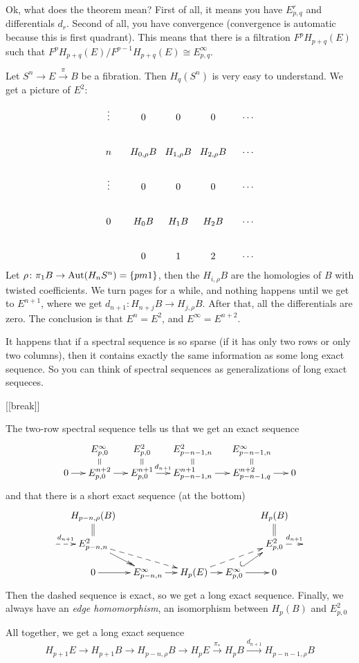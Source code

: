 Ok, what does the theorem mean? First of all, it means you have $E^r_{p,q}$ and differentials $d_r$. Second of all, you have convergence (convergence is automatic because this is first quadrant). This means that there is a filtration $F^pH_{p+q}(E)$ such that $F^pH_{p+q}(E)/F^{p-1}H_{p+q}(E) \cong E^\infty_{p,q}$.

\begin{example}
 Let $S^n\to E\xrightarrow\pi B$ be a fibration. Then $H_q(S^n)$ is very easy to understand. We get a picture of $E^2$:
 \[\xymatrix@!0 @+1pc{
  \vdots & 0 & 0 & 0 & \cdots\\
  n & H_{0,\rho} B & H_{1,\rho} B & H_{2,\rho}B & \cdots\\
  \vdots& 0 & 0 & 0 & \cdots \\
  0 & H_0B & H_1 B & H_2 B & \cdots\\
  & 0 & 1 & 2 & \cdots
 }\]
 Let $\rho\colon \pi_1 B\to \operatorname{Aut}(H_nS^n)=\{pm 1\}$, then the $H_{i,\rho} B$ are the homologies of $B$ with twisted coefficients. We turn pages for a while, and nothing happens until we get to $E^{n+1}$, where we get $d_{n+1}\colon H_{n+j}B\to H_{j,\rho}B$. After that, all the differentials are zero. The conclusion is that $E^n=E^2$, and $E^\infty=E^{n+2}$.
 
 It happens that if a spectral sequence is so sparse (if it has only two rows or only two columns), then it contains exactly the same information as some long exact sequence. So you can think of spectral sequences as generalizations of long exact sequeces.

 [[break]]
 
 The two-row spectral sequence tells us that we get an exact sequence
 \[\xymatrix@R-1.5pc @C-.8pc{
  & E^\infty_{p,0}\ar@{=}[d] & E^2_{p,0}\ar@{=}[d] & E^2_{p-n-1,n}\ar@{=}[d] & E^\infty_{p-n-1,n}\ar@{=}[d]\\
  0 \ar[r] & E^{n+2}_{p,0}\ar[r] & E^{n+1}_{p,0}\ar[r]^-{d_{n+1}} & E^{n+1}_{p-n-1,n} \ar[r] & E^{n+2}_{p-n-1,q}\ar[r]& 0
 }\]
 and that there is a short exact sequence (at the bottom)
 \[\xymatrix@-1pc{
  & H_{p-n,\rho}(B) \ar@{=}[d] & & & & H_p(B)\ar@{=}[d]\\
  \ar@{-->}[r]^-{d_{n+1}} & E^2_{p-n,n}\ar@{->>}[dr] \ar@{-->}[drr] & & & & E^2_{p,0} \ar@{-->}[r]^-{d_{n+1}} & \\
  & 0\ar[r] & E^\infty_{p-n,n}\ar[r] & H_p(E)\ar[r] \ar@{-->}[urr] & E^\infty_{p,0}\ar[r] \ar@{^(->}[ur] & 0
 }\]
 Then the dashed sequence is exact, so we get a long exact sequence. Finally, we always have an \emph{edge homomorphism}, an isomorphism between $H_p(B)$ and $E^2_{p,0}$
 
 All together, we get a long exact sequence
 \[
  H_{p+1}E\to H_{p+1} B\to H_{p-n,\rho}B\to H_pE\xrightarrow{\pi_*} H_p B \xrightarrow{d_{n+1}} H_{p-n-1,\rho} B
 \]
\end{example}
